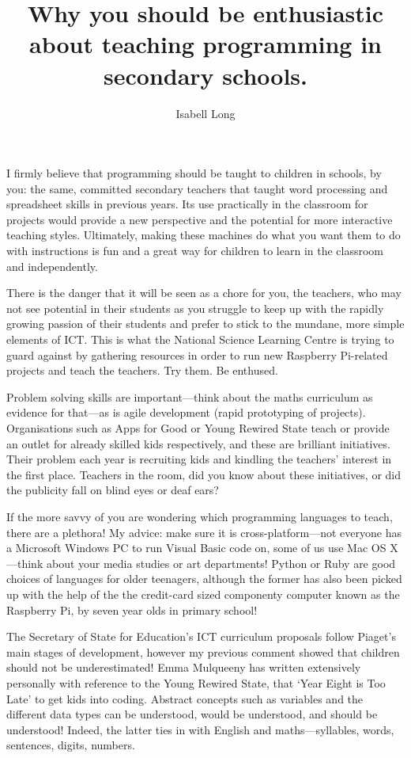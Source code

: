\documentclass[11pt,a4paper]{article}
\begin{document}
\title{Why you should be enthusiastic about teaching programming in secondary schools.}
\author{Isabell Long}
\maketitle

I firmly believe that programming should be taught to children in schools, by you: the same, committed secondary teachers that taught word processing and spreadsheet skills in previous years. Its use practically in the classroom for projects would provide a new perspective and the potential for more interactive teaching styles. Ultimately, making these machines do what you want them to do with instructions is fun and a great way for children to learn in the classroom and independently.

There is the danger that it will be seen as a chore for you, the teachers, who may not see potential in their students as you struggle to keep up with the rapidly growing passion of their students and prefer to stick to the mundane, more simple elements of ICT. This is what the National Science Learning Centre is trying to guard against by gathering resources in order to run new Raspberry Pi-related projects and teach the teachers. Try them. Be enthused.

Problem solving skills are important---think about the maths curriculum as evidence for that---as is agile development (rapid prototyping of projects). Organisations such as Apps for Good or Young Rewired State teach or provide an outlet for already skilled kids respectively, and these are brilliant initiatives. Their problem each year is recruiting kids and kindling the teachers' interest in the first place. Teachers in the room, did you know about these initiatives, or did the publicity fall on blind eyes or deaf ears?

If the more savvy of you are wondering which programming languages to teach, there are a plethora! My advice: make sure it is cross-platform---not everyone has a Microsoft Windows PC to run Visual Basic code on, some of us use Mac OS X---think about your media studies or art departments! Python or Ruby are good choices of languages for older teenagers, although the former has also been picked up with the help of the the credit-card sized componenty computer known as the Raspberry Pi,  by seven year olds in primary school!

The Secretary of State for Education's ICT curriculum proposals follow Piaget's main stages of development, however my previous comment showed that children should not be underestimated! Emma Mulqueeny has written extensively personally with reference to the Young Rewired State, that `Year Eight is Too Late' to get kids into coding. Abstract concepts such as variables and the different data types can be understood, would be understood, and should be understood! Indeed, the latter ties in with English and maths---syllables, words, sentences, digits, numbers.
\end{document}
